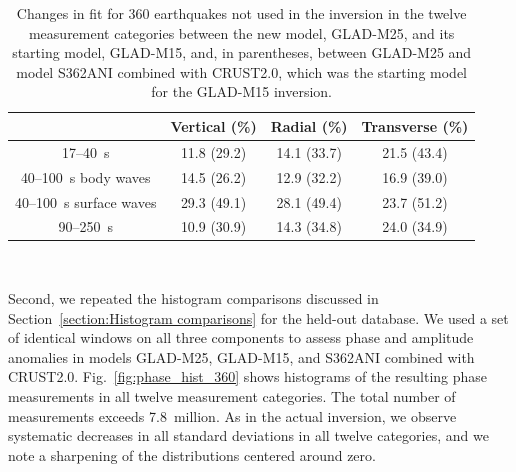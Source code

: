 \documentclass[extra,mreferee]{gji}
\begin{document}
\begin{table}[!htb]
  \centering
  \begin{tabular}{|c|c|c|c|}
  \hline
  ~          &  Vertical (\%) & Radial (\%) &  Transverse (\%) \\
  \hline
  17--40~s                &          11.8 (29.2) &       14.1 (33.7) &       21.5 (43.4) \\
  40--100~s body waves    &          14.5 (26.2) &       12.9 (32.2)  &       16.9 (39.0) \\
  40--100~s surface waves &          29.3 (49.1) &       28.1 (49.4) &       23.7 (51.2) \\
  90--250~s               &          10.9 (30.9) &       14.3 (34.8)  &       24.0 (34.9) \\
  \hline
  \end{tabular}\\
  \caption{Changes in fit for 360 earthquakes not used in the inversion in the twelve measurement categories
between the new model, GLAD-M25, and its starting model, GLAD-M15, and, in parentheses, between GLAD-M25 and model S362ANI combined with CRUST2.0, which was the starting model for the GLAD-M15 inversion.}
  \label{table:misfit_reduction_M15_M25_360}
\end{table}


Second, we repeated the histogram comparisons discussed in Section~\ref{section:Histogram comparisons} for the held-out database.
We used a set of identical windows on all three components to assess
phase and amplitude anomalies in models GLAD-M25, GLAD-M15, and S362ANI combined with CRUST2.0.
Fig.~\ref{fig:phase_hist_360} shows histograms of the resulting phase
measurements in all twelve measurement categories.
The total number of measurements exceeds 7.8~million.
As in the actual inversion,
we observe systematic decreases in all standard deviations in all twelve categories,
and we note a sharpening of the distributions centered around zero.
\end{document}
